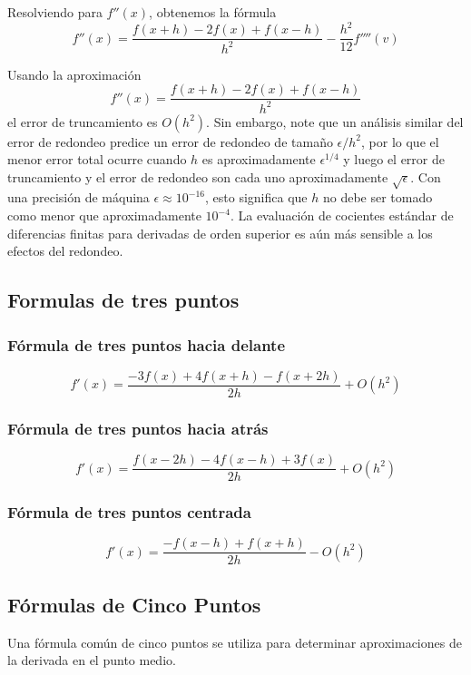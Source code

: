 Resolviendo para $f''(x)$, obtenemos la fórmula
\[ f''(x) = \frac{f(x + h) - 2 f(x) + f(x - h)}{h^2} - \frac{h^2}{12} f''''(v)\]

Usando la aproximación
\begin{equation}
    f''(x) = \frac{f(x + h) - 2 f(x) + f(x - h)}{h^2}
    \label{Eq: (9.3)}
\end{equation}
el error de truncamiento es $O(h^2)$. Sin embargo, note que un análisis similar del error de redondeo predice un error de redondeo de tamaño $\epsilon / h^2$, por lo que el menor error total ocurre cuando $h$ es aproximadamente $\epsilon^{1/4}$ y luego el error de truncamiento y el error de redondeo son cada uno aproximadamente $\sqrt{\epsilon}$. Con una precisión de máquina $\epsilon \approx 10^{-16}$, esto significa que $h$ no debe ser tomado como menor que aproximadamente $10^{-4}$. La evaluación de cocientes estándar de diferencias finitas para derivadas de orden superior es aún más sensible a los efectos del redondeo.

\subsection{Formulas de tres puntos}
\subsubsection{Fórmula de tres puntos hacia delante}
\begin{equation}
    f'(x) = \frac{-3 f(x) + 4 f(x + h) - f(x + 2h)}{2h}  + O(h^2)
\end{equation}

\subsubsection{Fórmula de tres puntos hacia atrás}
\begin{equation}
    f'(x) = \frac{f(x - 2h) - 4 f(x - h) + 3 f(x)}{2h} + O(h^2)
\end{equation}

\subsubsection{Fórmula de tres puntos centrada}
\begin{equation}
    f'(x) = \frac{-f(x - h) + f(x + h)}{2h} - O(h^2)
\end{equation}

\subsection{Fórmulas de Cinco Puntos}
Una fórmula común de cinco puntos se utiliza para determinar aproximaciones de la derivada en el punto medio.

